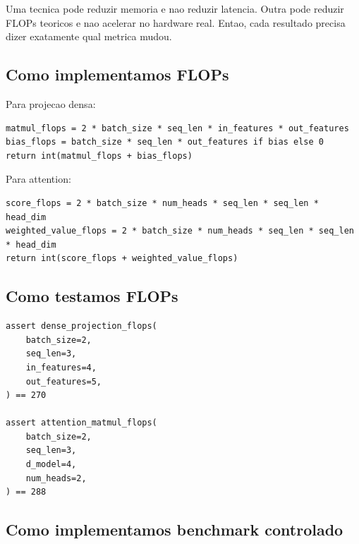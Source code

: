 Uma tecnica pode reduzir memoria e nao reduzir latencia. Outra pode reduzir FLOPs teoricos e nao acelerar no hardware real. Entao, cada resultado precisa dizer exatamente qual metrica mudou.



\subsection{Como implementamos FLOPs}



Para projecao densa:



\begin{Verbatim}[fontsize=\small,breaklines=true,label=python]
matmul_flops = 2 * batch_size * seq_len * in_features * out_features
bias_flops = batch_size * seq_len * out_features if bias else 0
return int(matmul_flops + bias_flops)
\end{Verbatim}



Para attention:



\begin{Verbatim}[fontsize=\small,breaklines=true,label=python]
score_flops = 2 * batch_size * num_heads * seq_len * seq_len * head_dim
weighted_value_flops = 2 * batch_size * num_heads * seq_len * seq_len * head_dim
return int(score_flops + weighted_value_flops)
\end{Verbatim}



\subsection{Como testamos FLOPs}



\begin{Verbatim}[fontsize=\small,breaklines=true,label=python]
assert dense_projection_flops(
    batch_size=2,
    seq_len=3,
    in_features=4,
    out_features=5,
) == 270

assert attention_matmul_flops(
    batch_size=2,
    seq_len=3,
    d_model=4,
    num_heads=2,
) == 288
\end{Verbatim}



\subsection{Como implementamos benchmark controlado}



